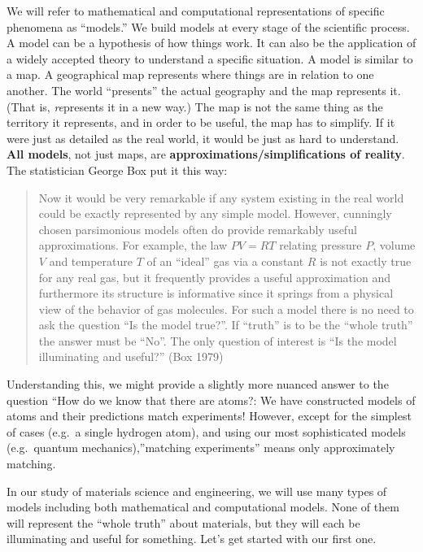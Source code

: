 \documentclass{book}
\begin{document}
We will refer to mathematical and computational representations of specific
phenomena as ``models.'' We build models at every stage of the scientific
process. A model can be a hypothesis of how things work. It can also be the
application of a widely accepted theory to understand a specific situation. A
model is similar to a map. A geographical map represents where things are in
relation to one another. The world ``presents'' the actual geography and the
map represents it. (That is, \emph{re}presents it in a new way.) The map is
not the same thing as the territory it represents, and in order to be useful,
the map has to simplify. If it were just as detailed as the real world, it
would be just as hard to understand. \textbf{All models}, not just maps, are
\textbf{approximations/simplifications of reality}. The statistician George
Box put it this way:

\begin{quote}
Now it would be very remarkable if any system existing in the real world could
be exactly represented by any simple model. However, cunningly chosen
parsimonious models often do provide remarkably useful approximations. For
example, the law \(PV = RT\) relating pressure \(P\), volume \(V\) and
temperature \(T\) of an ``ideal'' gas via a constant \(R\) is not exactly true
for any real gas, but it frequently provides a useful approximation and
furthermore its structure is informative since it springs from a physical view
of the behavior of gas molecules. For such a model there is no need to ask the
question ``Is the model true?''. If ``truth'' is to be the ``whole truth'' the
answer must be ``No''. The only question of interest is ``Is the model
illuminating and useful?'' (Box 1979)
\end{quote}

Understanding this, we might provide a slightly more nuanced answer to the
question ``How do we know that there are atoms?: We have constructed models of
atoms and their predictions match experiments! However, except for the
simplest of cases (e.g.~a single hydrogen atom), and using our most
sophisticated models (e.g.~quantum mechanics),''matching experiments'' means
only approximately matching.

In our study of materials science and engineering, we will use many types of
models including both mathematical and computational models. None of them will
represent the ``whole truth'' about materials, but they will each be
illuminating and useful for something. Let's get started with our first one.
\end{document}
